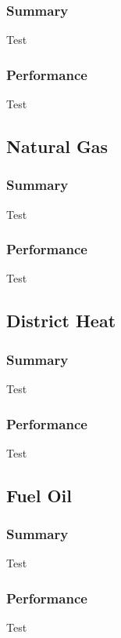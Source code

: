 \subsubsection{Summary}
Test

\subsubsection{Performance}
Test

\subsection{Natural Gas}

\subsubsection{Summary}
Test

\subsubsection{Performance}
Test

\subsection{District Heat}

\subsubsection{Summary}
Test

\subsubsection{Performance}
Test

\subsection{Fuel Oil}

\subsubsection{Summary}
Test

\subsubsection{Performance}
Test